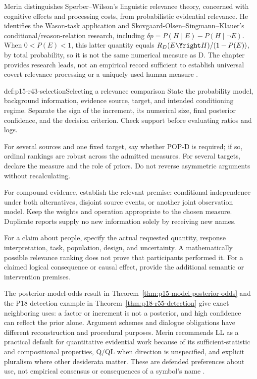 Merin distinguishes Sperber--Wilson's linguistic relevance theory,
concerned with cognitive effects and processing costs, from probabilistic
evidential relevance. He identifies the Wason-task application and
Skovgaard-Olsen--Singmann--Klauer's conditional/reason-relation research,
including \(\delta p=P(H\mid E)-P(H\mid\neg E)\).
When \(0<P(E)<1\), this latter quantity equals
\(R_D(E\Yright H)/(1-P(E))\), by total probability, so it is not
the same numerical measure as D. The chapter provides research leads,
not an empirical record sufficient to establish universal covert
relevance processing or a uniquely used human measure
\parencite[pp.~273--274 and p.~274, nn.~18--20]{Merin2021Relevance}.

\begin{hbmethod}{def:p15-r43-selection}{Selecting a relevance comparison}
State the probability model, background information, evidence source,
target, and intended conditioning regime. Separate the sign of the
increment, its numerical size, final posterior confidence, and the
decision criterion. Check support before evaluating ratios and logs.

For several sources and one fixed target, say whether POP-D is required;
if so, ordinal rankings are robust across the admitted measures.
For several targets, declare the measure and the role of priors.
Do not reverse asymmetric arguments without recalculating.

For compound evidence, establish the relevant premise: conditional
independence under both alternatives, disjoint source events, or another
joint observation model. Keep the weights and operation appropriate
to the chosen measure. Duplicate reports supply no new information
solely by receiving new names.

For a claim about people, specify the actual requested quantity,
response interpretation, task, population, design, and uncertainty.
A mathematically possible relevance ranking does not prove that
participants performed it. For a claimed logical consequence or causal
effect, provide the additional semantic or intervention premises.
\end{hbmethod}

The posterior-model-odds result in
Theorem~\ref{thm:p15-model-posterior-odds} and the P18 detection example
in Theorem~\ref{thm:p18-r55-detection} give exact neighboring uses:
a factor or increment is not a posterior, and high confidence can
reflect the prior alone. Argument schemes and dialogue obligations
have different reconstruction and procedural purposes. Merin recommends
LL as a practical default for quantitative evidential work because of
its sufficient-statistic and compositional properties, Q/QL when
direction is unspecified, and explicit pluralism where other
desiderata matter. These are defended preferences about use, not
empirical consensus or consequences of a symbol's name
\parencite[p.~274]{Merin2021Relevance}.

